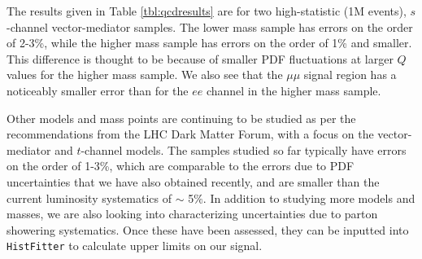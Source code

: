 The results given in Table \ref{tbl:qcdresults} are for two high-statistic (1M events), $s$-channel vector-mediator samples. The lower mass sample has errors on the order of 2-3\%, while the higher mass sample has errors on the order of 1\% and smaller. This difference is thought to be because of smaller PDF fluctuations at larger $Q$ values for the higher mass sample. We also see that the $\mu\mu$ signal region has a noticeably smaller error than for the $ee$ channel in the higher mass sample.

Other models and mass points are continuing to be studied as per the recommendations from the LHC Dark Matter Forum, with a focus on the vector-mediator and $t$-channel models. The samples studied so far typically have errors on the order of 1-3\%, which are comparable to the errors due to PDF uncertainties that we have also obtained recently, and are smaller than the current luminosity systematics of $\sim$ 5$\%$. In addition to studying more models and masses, we are also looking into characterizing uncertainties due to parton showering systematics. Once these have been assessed, they can be inputted into \texttt{HistFitter} to calculate upper limits on our signal.